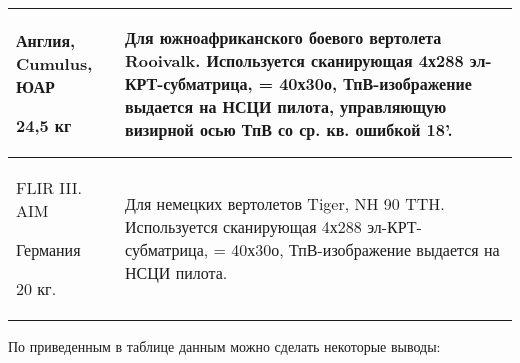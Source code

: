 \begin{landscape}
\begin{longtable}{| p{6cm} | p{18cm} |}
	Англия, Cumulus, ЮАР		
	
	24,5 кг       
& 
Для южноафриканского боевого вертолета Rooivalk. Используется сканирующая 4х288 эл-КРТ-субматрица, = 40х30о, ТпВ-изображение выдается на НСЦИ пилота, управляющую визирной осью ТпВ со ср. кв. ошибкой 18'.     
\\ \hline
	FLIR III. AIM	
	
	Германия		
	
	20 кг.       
& 
Для немецких вертолетов Tiger, NH 90 TTH. Используется сканирующая 4х288 эл-КРТ-субматрица, = 40х30о, ТпВ-изображение выдается на НСЦИ пилота.     
\\ \hline

\end{longtable}

\end{landscape}

По приведенным в таблице данным можно сделать некоторые выводы: 


